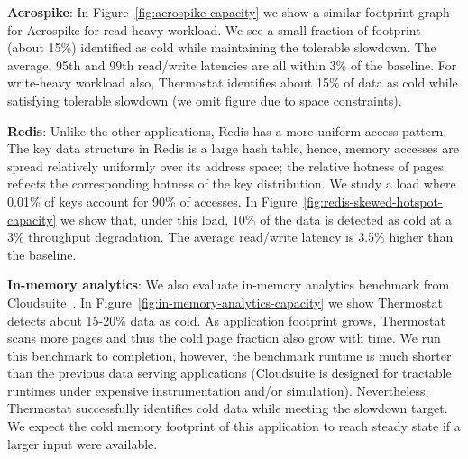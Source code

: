 \textbf{Aerospike}:
In Figure~\ref{fig:aerospike-capacity} we show a similar footprint graph for
Aerospike for read-heavy workload. We see a small fraction of footprint (about 15\%) identified
as cold while maintaining the tolerable slowdown. The average, 95th and 99th
read/write latencies are all within 3\% of the baseline. For write-heavy
workload also, Thermostat identifies about 15\% of data as cold while satisfying
tolerable slowdown (we omit figure due to space constraints).

\textbf{Redis}:
Unlike the other applications, Redis has a more uniform access pattern.
The key data structure in Redis is a large hash table, hence, memory accesses
are spread relatively uniformly over its address space; the relative hotness
of pages reflects the corresponding hotness of the key distribution.
We study a load where 0.01\% of keys account for 90\% of accesses.
In Figure~\ref{fig:redis-skewed-hotspot-capacity} we show that, under this load, 10\% of the data is detected as cold at a 3\% throughput degradation. 
The average read/write latency is 3.5\% higher than the baseline.


\textbf{In-memory analytics}:
We also evaluate in-memory analytics benchmark from
Cloudsuite~\cite{cloudsuite}.  In Figure~\ref{fig:in-memory-analytics-capacity}
we show Thermostat detects about 15-20\% data as cold. As application footprint
grows, Thermostat scans more pages and thus the cold page fraction also grow with time.
We run this benchmark to completion, however, the benchmark runtime is much shorter
than the previous data serving applications (Cloudsuite is 
designed for tractable runtimes under expensive instrumentation and/or simulation). 
Nevertheless,  Thermostat successfully identifies cold data while meeting the
slowdown target.  We expect the cold memory footprint of this application to 
reach steady state if a larger input were available.

